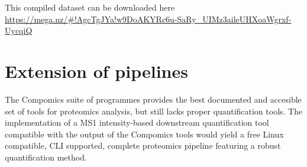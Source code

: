 \documentclass[11pt, a4paper]{report}
\begin{document}
This compiled dataset can be downloaded here \href{https://mega.nz/\#!AgcTgJYa!w9DoAKYRc6u-SaRy\_UIMz3aileUHXoaWgrxf-UycqiQ}{https://mega.nz/\#!AgcTgJYa!w9DoAKYRc6u-SaRy\_UIMz3aileUHXoaWgrxf-UycqiQ}

\section{Extension of pipelines}

The Compomics suite of programmes provides the best documented and accesible set of tools for proteomics analysis, but still lacks proper quantification tools. The implementation of a MS1 intensity-based downstream quantification tool compatible with the output of the Compomics tools would yield a free Linux compatible, CLI supported, complete proteomics pipeline featuring a robust quantification method.


\footnotesize{}
\end{document}
